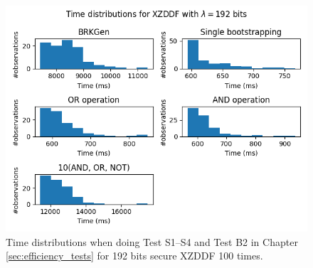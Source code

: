 \begin{figure}[ht]
    \centering
    \includegraphics[width=\textwidth]{data/figures/XZDDF_STD192_distributions.png}
    \caption{Time distributions when doing Test S1--S4 and Test B2 in Chapter \ref{sec:efficiency_tests} for 192 bits secure XZDDF 100 times.}
    \label{fig:distr_xzddf192}
\end{figure}

        
